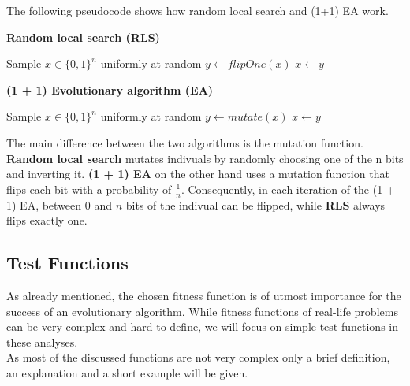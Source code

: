 The following pseudocode shows how random local search and (1+1) EA work.\\[2ex]
\noindent
\begin{minipage}{0.48\textwidth}
\textbf{Random local search (RLS)}
\begin{algorithmic}
\State Sample $x \in \{0, 1\}^n$ uniformly at random
  \State $y \gets flipOne(x)$
   $x \gets y$
\EndFor
\end{algorithmic}
\end{minipage}
\hfill
\begin{minipage}{0.48\textwidth}
\textbf{(1 + 1) Evolutionary algorithm (EA)}
\begin{algorithmic}
\State Sample $x \in \{0, 1\}^n$ uniformly at random
  \State $y \gets mutate(x)$
   $x \gets y$
\EndFor
\end{algorithmic}
\end{minipage}
The main difference between the two algorithms is the mutation function. \textbf{Random local search} mutates indivuals by randomly choosing one of the n bits and inverting it. \textbf{(1 + 1) EA} on the other hand uses a mutation function that flips each bit with a probability of $\frac{1}{n}$. Consequently, in each iteration of the (1 + 1) EA, between $0$ and $n$ bits of the indivual can be flipped, while \textbf{RLS} always flips exactly one. \\

\subsection{Test Functions}
As already mentioned, the chosen fitness function is of utmost importance for the success of an evolutionary algorithm. While fitness functions of real-life problems can be very complex and hard to define, we will focus on simple test functions in these analyses. \\
As most of the discussed functions are not very complex only a brief definition, an explanation and a short example will be given.\\
